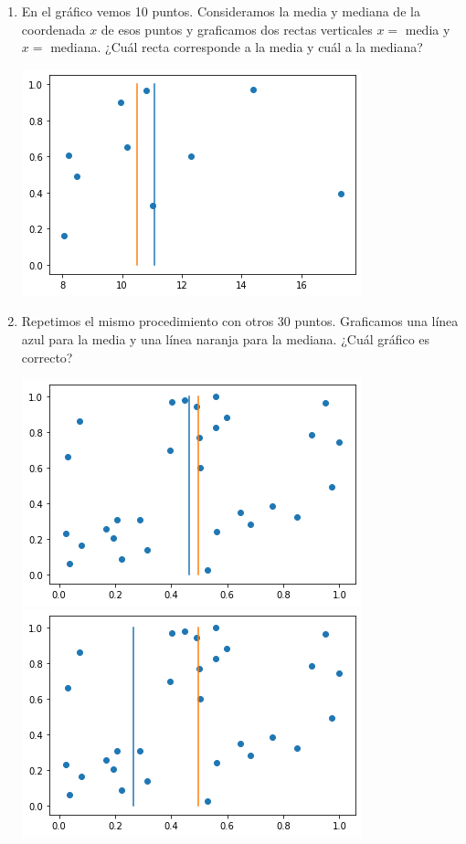 \documentclass[a4paper,11pt]{article}
\theoremstyle{definition}
\begin{document}
\begin{enumerate}[resume]
\item En el gráfico vemos 10 puntos. Consideramos la media y mediana de la coordenada $x$ de esos puntos y graficamos dos rectas verticales $x = $ media y $x = $ mediana. ¿Cuál recta corresponde a la media y cuál a la mediana?

\begin{center}
\includegraphics[scale=0.6]{practica2-img-media_mediana_1.png}
\end{center}

\item Repetimos el mismo procedimiento con otros 30 puntos. Graficamos una línea azul para la media y una línea naranja para la mediana. ¿Cuál gráfico es correcto?

\begin{center}
\includegraphics[scale=0.5]{practica2-img-media_mediana_2.png}
\includegraphics[scale=0.5]{practica2-img-media_mediana_3.png}
\end{center}



\end{enumerate}
\end{document}
